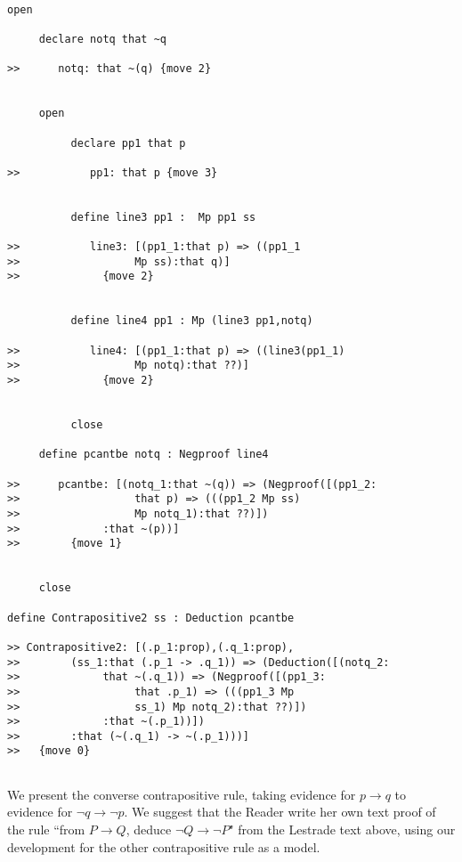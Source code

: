 \documentclass[12pt]{article}
\begin{document}
\begin{verbatim}

open

     declare notq that ~q

>>      notq: that ~(q) {move 2}


     open

          declare pp1 that p

>>           pp1: that p {move 3}


          define line3 pp1 :  Mp pp1 ss

>>           line3: [(pp1_1:that p) => ((pp1_1 
>>                  Mp ss):that q)]
>>             {move 2}


          define line4 pp1 : Mp (line3 pp1,notq)

>>           line4: [(pp1_1:that p) => ((line3(pp1_1) 
>>                  Mp notq):that ??)]
>>             {move 2}


          close

     define pcantbe notq : Negproof line4

>>      pcantbe: [(notq_1:that ~(q)) => (Negproof([(pp1_2:
>>                  that p) => (((pp1_2 Mp ss) 
>>                  Mp notq_1):that ??)])
>>             :that ~(p))]
>>        {move 1}


     close

define Contrapositive2 ss : Deduction pcantbe

>> Contrapositive2: [(.p_1:prop),(.q_1:prop),
>>        (ss_1:that (.p_1 -> .q_1)) => (Deduction([(notq_2:
>>             that ~(.q_1)) => (Negproof([(pp1_3:
>>                  that .p_1) => (((pp1_3 Mp 
>>                  ss_1) Mp notq_2):that ??)])
>>             :that ~(.p_1))])
>>        :that (~(.q_1) -> ~(.p_1)))]
>>   {move 0}


\end{verbatim}

We present the converse contrapositive rule, taking evidence for $p \rightarrow q$ to evidence for $\neg q \rightarrow \neg p$.  We suggest that the Reader write her own text proof of the rule ``from $P \rightarrow Q$, deduce $\neg Q \rightarrow \neg P$" from the Lestrade text above, using our development for the other contrapositive rule as a model.
\end{document}
